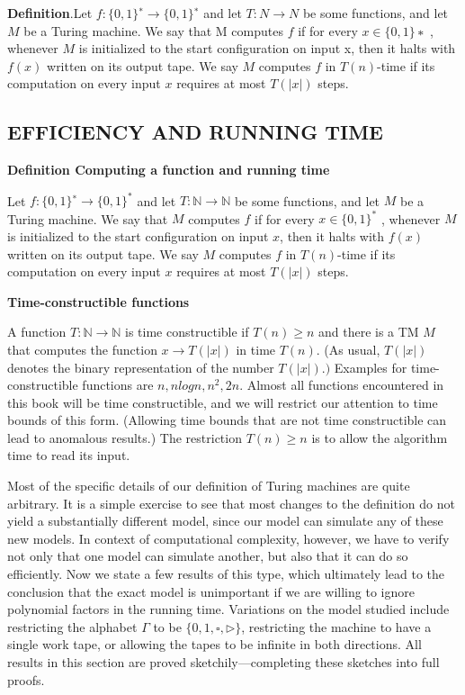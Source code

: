 \documentclass[a4paper,12pt]{article}
\begin{document}
\textbf{Definition}.Let $f : \{0, 1\}^∗ → \{0, 1\}^∗$ and let $T : N → N$ be some functions, and let $M$ be a Turing
machine. We say that M computes $f$ if for every $x ∈ \{0, 1\}∗$ , whenever $M$ is initialized
to the start configuration on input x, then it halts with $f(x)$ written on its output tape.
We say $M$ computes $f$ in $T(n)$-time if its computation on every input $x$ requires at
most $T(|x|)$ steps.

\subsection{EFFICIENCY AND RUNNING TIME}

\textbf{Definition Computing a function and running time}

Let $f : \{0, 1\}^{∗} \rightarrow \{0, 1\}^{*}$ and let $T :  \mathbb{N} →  \mathbb{N}$ be some functions, and let $M$ be a Turing
machine. We say that $M$ computes $f$ if for every $x \in \{0, 1\}^{*}$ , whenever $M$ is initialized
to the start configuration on input $x$, then it halts with $f(x)$ written on its output tape.
We say $M$ computes $f$ in $T(n)$-time if its computation on every input $x$ requires at most $T(|x|)$ steps.

\textbf{Time-constructible functions}

A function $T : \mathbb{N} \rightarrow \mathbb{N}$ is time constructible if $T(n) \geq n$ and there is a TM $M$ that
computes the function $x  \rightarrow  T(|x|)$  in time $T(n)$. (As usual,  $T(|x|)$  denotes the binary
representation of the number $T(|x|).)$ Examples for time-constructible functions are $n, nlogn, n^2 , 2n $. Almost all functions encountered in this book will be time constructible,
and we will restrict our attention to time bounds of this form. (Allowing time bounds
that are not time constructible can lead to anomalous results.) The restriction $T(n) \geq n$
is to allow the algorithm time to read its input.

Most of the specific details of our definition of Turing machines are quite arbitrary. It is
a simple exercise to see that most changes to the definition do not yield a substantially
different model, since our model can simulate any of these new models. In context of
computational complexity, however, we have to verify not only that one model can
simulate another, but also that it can do so efficiently. Now we state a few results of this
type, which ultimately lead to the conclusion that the exact model is unimportant if we
are willing to ignore polynomial factors in the running time. Variations on the model
studied include restricting the alphabet $\Gamma$ to be $\{0, 1, \square, \rhd \}$, restricting the machine to
have a single work tape, or allowing the tapes to be infinite in both directions. All results
in this section are proved sketchily—completing these sketches into full proofs.
\end{document}
